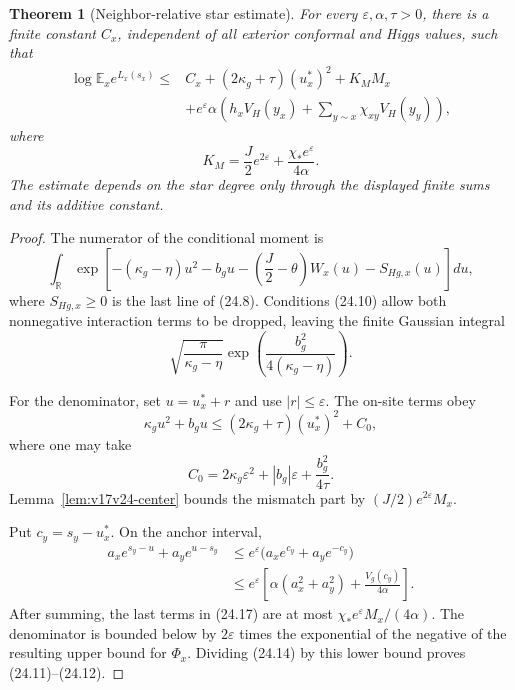 \documentclass[11pt]{article}
\newtheorem{theorem}{Theorem}[section]
\theoremstyle{remark}
\begin{document}
\begin{theorem}[Neighbor-relative star estimate]
\label{thm:v17v24-star}
For every \(\varepsilon,\alpha,\tau>0\), there is a finite constant
\(C_x\), independent of all exterior conformal and Higgs values, such
that
\[
\begin{aligned}
 \log\mathbb E_x e^{L_x(s_x)}
 \leq{}&C_x+(2\kappa_g+\tau)(u_x^*)^2+K_M M_x\\
 &+e^{\varepsilon}\alpha
 \left(h_xV_H(y_x)
 +\sum_{y\sim x}\chi_{xy}V_H(y_y)\right),         \tag{24.11}
\end{aligned}
\]
where
\[
 K_M=\frac J2e^{2\varepsilon}
 +\frac{\chi_*e^{\varepsilon}}{4\alpha}.          \tag{24.12}
\]
The estimate depends on the star degree only through the displayed
finite sums and its additive constant.
\end{theorem}

\begin{proof}
The numerator of the conditional moment is
\[
 \int_{\mathbb R}
 \exp\left[-(\kappa_g-\eta)u^2-b_gu
 -\left(\frac J2-\theta\right)W_x(u)
 -S_{H\!g,x}(u)\right]du,                          \tag{24.13}
\]
where \(S_{H\!g,x}\geq0\) is the last line of (24.8).  Conditions
(24.10) allow both nonnegative interaction terms to be dropped, leaving
the finite Gaussian integral
\[
 \sqrt{\frac{\pi}{\kappa_g-\eta}}
 \exp\left(\frac{b_g^2}{4(\kappa_g-\eta)}\right). \tag{24.14}
\]

For the denominator, set \(u=u_x^*+r\) and use
\(|r|\leq\varepsilon\).  The on-site terms obey
\[
 \kappa_gu^2+b_gu
 \leq(2\kappa_g+\tau)(u_x^*)^2+C_0,               \tag{24.15}
\]
where one may take
\[
 C_0=2\kappa_g\varepsilon^2+|b_g|\varepsilon
 +\frac{b_g^2}{4\tau}.                            \tag{24.16}
\]
Lemma~\ref{lem:v17v24-center} bounds the mismatch part by
\((J/2)e^{2\varepsilon}M_x\).

Put \(c_y=s_y-u_x^*\).  On the anchor interval,
\[
\begin{aligned}
 a_xe^{s_y-u}+a_ye^{u-s_y}
 &\leq e^{\varepsilon}
 \bigl(a_xe^{c_y}+a_ye^{-c_y}\bigr)\\
 &\leq e^{\varepsilon}\left[
 \alpha(a_x^2+a_y^2)
 +\frac{V_g(c_y)}{4\alpha}
 \right].                                        \tag{24.17}
\end{aligned}
\]
After summing, the last terms in (24.17) are at most
\(\chi_*e^{\varepsilon}M_x/(4\alpha)\).  The denominator is bounded
below by \(2\varepsilon\) times the exponential of the negative of the
resulting upper bound for \(\Phi_x\).  Dividing (24.14) by this lower
bound proves (24.11)--(24.12).
\end{proof}
\end{document}
